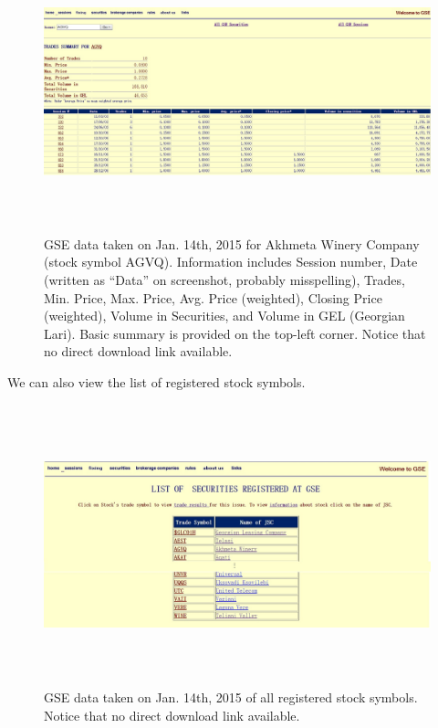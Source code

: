 \documentclass[a4paper]{article}
\begin{document}
\begin{figure}[H]
\centering
\includegraphics[width=6.3in, height=3.2in]{images/AGVQ.jpg}
\caption{GSE data taken on Jan. 14th, 2015 for Akhmeta Winery Company (stock symbol AGVQ). Information includes Session number, Date (written as ``Data'' on screenshot, probably misspelling), Trades, Min. Price, Max. Price, Avg. Price (weighted), Closing Price (weighted), Volume in Securities, and Volume in GEL (Georgian Lari). Basic summary is provided on the top-left corner. Notice that no direct download link available.}
\label{fig:AGVQ}
\end{figure}

We can also view the list of registered stock symbols.

\begin{figure}[H]
\centering
\includegraphics[width=6.3in, height=3.2in]{images/stocks.jpg}
\caption{GSE data taken on Jan. 14th, 2015 of all registered stock symbols. Notice that no direct download link available.}
\label{fig:stocks}
\end{figure}
\end{document}
